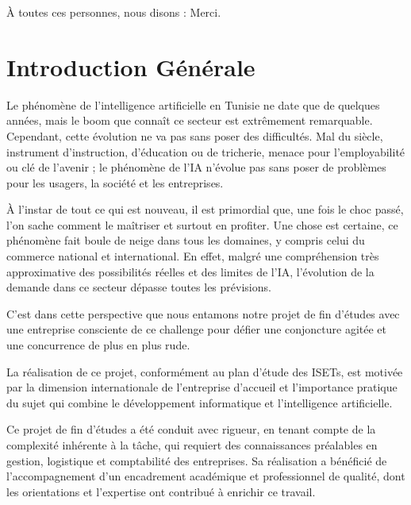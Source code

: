 \documentclass[a4paper,12pt]{report}
\begin{document}
À toutes ces personnes, nous disons : Merci.


\tableofcontents
\listoffigures
\listoftables

\cleardoublepage
\setcounter{page}{1}


\chapter*{Introduction Générale}

Le phénomène de l'intelligence artificielle en Tunisie ne date que de quelques
années, mais le boom que connaît ce secteur est extrêmement remarquable.
Cependant, cette évolution ne va pas sans poser des difficultés. Mal du siècle,
instrument d'instruction, d'éducation ou de tricherie, menace pour
l'employabilité ou clé de l'avenir ; le phénomène de l'IA n'évolue pas sans
poser de problèmes pour les usagers, la société et les entreprises.

À l'instar de tout ce qui est nouveau, il est primordial que, une fois le choc passé, l'on sache comment le maîtriser et surtout en profiter.
Une chose est certaine, ce phénomène fait boule de neige dans tous les domaines,
y compris celui du commerce national et international. En effet, malgré une
compréhension très approximative des possibilités réelles et des limites de
l'IA, l'évolution de la demande dans ce secteur dépasse toutes les prévisions.

C'est dans cette perspective que nous entamons notre projet de fin d'études avec une entreprise consciente de ce challenge pour défier
une conjoncture agitée et une concurrence de plus en plus rude.

La réalisation de ce projet, conformément au plan d'étude des ISETs, est motivée
par la dimension internationale de l'entreprise d'accueil et l'importance
pratique du sujet qui combine le développement informatique et l'intelligence
artificielle.

Ce projet de fin d'études a été conduit avec rigueur, en tenant compte de la complexité inhérente à la tâche, qui requiert des connaissances préalables en gestion, logistique et comptabilité des entreprises. Sa réalisation a bénéficié de l'accompagnement d'un encadrement académique et professionnel de qualité, dont les orientations et l'expertise ont contribué à enrichir ce travail.
\end{document}
